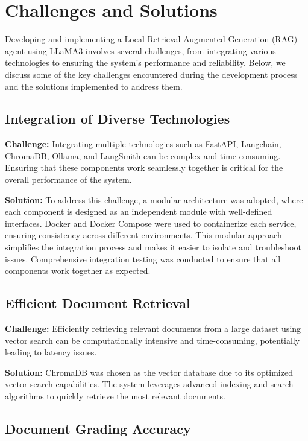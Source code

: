 \section{Challenges and Solutions}

Developing and implementing a Local Retrieval-Augmented Generation (RAG) agent using LLaMA3 involves several challenges, from integrating various technologies to ensuring the system's performance and reliability. Below, we discuss some of the key challenges encountered during the development process and the solutions implemented to address them.

\subsection{Integration of Diverse Technologies}

\textbf{Challenge:} Integrating multiple technologies such as FastAPI, Langchain, ChromaDB, Ollama, and LangSmith can be complex and time-consuming. Ensuring that these components work seamlessly together is critical for the overall performance of the system.

\textbf{Solution:} To address this challenge, a modular architecture was adopted, where each component is designed as an independent module with well-defined interfaces. Docker and Docker Compose were used to containerize each service, ensuring consistency across different environments. This modular approach simplifies the integration process and makes it easier to isolate and troubleshoot issues. Comprehensive integration testing was conducted to ensure that all components work together as expected.

\subsection{Efficient Document Retrieval}

\textbf{Challenge:} Efficiently retrieving relevant documents from a large dataset using vector search can be computationally intensive and time-consuming, potentially leading to latency issues.

\textbf{Solution:} ChromaDB was chosen as the vector database due to its optimized vector search capabilities. The system leverages advanced indexing and search algorithms to quickly retrieve the most relevant documents.

\subsection{Document Grading Accuracy}

